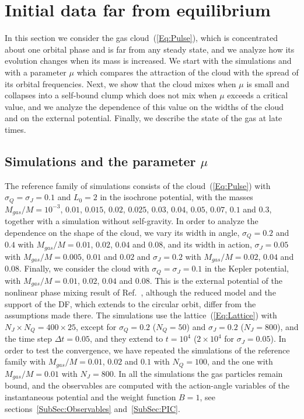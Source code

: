 \section{Initial data far from equilibrium}
\label{Sec:FarFromEq}

In this section we consider the gas cloud~(\ref{Eq:Pulse}), which is concentrated about one orbital phase and is far from any steady state, and we analyze how its evolution changes when its mass is increased. We start with the simulations and with a parameter $\mu$ which compares the attraction of the cloud with the spread of its orbital frequencies. Next, we show that the cloud mixes when $\mu$ is small and collapses into a self-bound clump which does not mix when $\mu$ exceeds a critical value, and we analyze the dependence of this value on the widths of the cloud and on the external potential. Finally, we describe the state of the gas at late times.


\subsection{Simulations and the parameter $\mu$}
\label{SubSec:FarRuns}

The reference family of simulations consists of the cloud~(\ref{Eq:Pulse}) with $\sigma_Q = \sigma_J = 0.1$ and $L_0 = 2$ in the isochrone potential, with the masses $M_{gas}/M = 10^{-3}$, $0.01$, $0.015$, $0.02$, $0.025$, $0.03$, $0.04$, $0.05$, $0.07$, $0.1$ and $0.3$, together with a simulation without self-gravity. In order to analyze the dependence on the shape of the cloud, we vary its width in angle, $\sigma_Q = 0.2$ and $0.4$ with $M_{gas}/M = 0.01$, $0.02$, $0.04$ and $0.08$, and its width in action, $\sigma_J = 0.05$ with $M_{gas}/M = 0.005$, $0.01$ and $0.02$ and $\sigma_J = 0.2$ with $M_{gas}/M = 0.02$, $0.04$ and $0.08$. Finally, we consider the cloud with $\sigma_Q = \sigma_J = 0.1$ in the Kepler potential, with $M_{gas}/M = 0.01$, $0.02$, $0.04$ and $0.08$. This is the external potential of the nonlinear phase mixing result of Ref.~\cite{sCjL26}, although the reduced model and the support of the DF, which extends to the circular orbit, differ from the assumptions made there. The simulations use the lattice~(\ref{Eq:Lattice}) with $N_J\times N_Q = 400\times 25$, except for $\sigma_Q = 0.2$ ($N_Q = 50$) and $\sigma_J = 0.2$ ($N_J = 800$), and the time step $\Delta t = 0.05$, and they extend to $t = 10^4$ ($2\times 10^4$ for $\sigma_J = 0.05$). In order to test the convergence, we have repeated the simulations of the reference family with $M_{gas}/M = 0.01$, $0.02$ and $0.1$ with $N_Q = 100$, and the one with $M_{gas}/M = 0.01$ with $N_J = 800$. In all the simulations the gas particles remain bound, and the observables are computed with the action-angle variables of the instantaneous potential and the weight function $B = 1$, see sections~\ref{SubSec:Observables} and~\ref{SubSec:PIC}.

